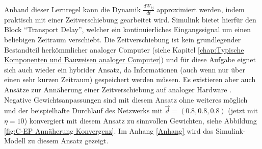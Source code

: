 Anhand dieser Lernregel kann die Dynamik \(\frac{dW_{ij}}{dt}\) approximiert werden, indem praktisch mit einer Zeitverschiebung gearbeitet wird. Simulink bietet hierfür den Block "`Transport Delay"', welcher ein kontinuierliches Eingangssignal um einen beliebigen Zeitraum verschiebt. Die Zeitverschiebung ist kein grundlegender Bestandteil herkömmlicher analoger Computer (siehe Kapitel \ref{chap:Typische Komponenten und Bauweisen analoger Computer}) und für diese Aufgabe eignet sich auch wieder ein hybrider Ansatz, da Informationen (auch wenn nur über einen sehr kurzen Zeitraum) gespeichert werden müssen. Es existieren aber auch Ansätze zur Annäherung einer Zeitverschiebung auf analoger Hardware \cite[vgl. S. 117 ff.]{Ulmann2022}. Negative Gewichtsanpassungen sind mit diesem Ansatz ohne weiteres möglich und der beispielhafte Durchlauf des Netzwerks mit \(\vec{d}=(0.8,0.8,0.8)\) (jetzt mit \(\eta=10\)) konvergiert mit diesem Ansatz zu sinnvollen Gewichten, siehe Abbildung \ref{fig:C-EP Annäherung Konvergenz}. Im Anhang \ref{Anhang} wird das Simulink-Modell zu diesem Ansatz gezeigt.

